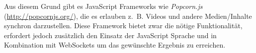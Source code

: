 Aus diesem Grund gibt es JavaScript Frameworks wie \emph{Popcorn.js} (\url{http://popcornjs.org/}), die es erlauben z.~B. Videos und andere Medien/Inhalte synchron darzustellen.
Diese Framework bietet zwar die nötige Funktionalität, erfordert jedoch zusätzlich den Einsatz der JavaScript Sprache und in Kombination mit WebSockets um das gewünschte Ergebnis zu erreichen. \cite[Vgl.][]{bocoup.2014}

